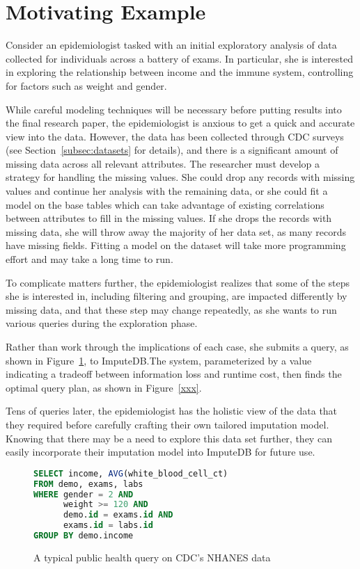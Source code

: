 \section{Motivating Example}
Consider an epidemiologist tasked with an initial
exploratory analysis of data collected for individuals across
a battery of exams. In particular, she is interested in exploring
the relationship between income and the immune system,
controlling for factors such as weight and gender.

While careful modeling techniques will be necessary before putting
results into the final research paper, the epidemiologist is anxious
to get a quick and accurate view into the data. However,
the data has been collected through CDC surveys (see Section~\ref{subsec:datasets} for details),
and there is a significant amount of missing data across all
relevant attributes. The researcher must develop a strategy
for handling the missing values. She could drop any records with
missing values and continue her analysis with the remaining data,
or she could fit a model on the base tables which can take advantage of existing correlations between attributes to fill in the missing values.
If she drops the records with missing data, she will throw away the majority of her data set, as many records have missing fields.
Fitting a model on the dataset will take more programming effort and may take a long time to run.

To complicate matters further, the epidemiologist realizes that
some of the steps she is interested in, including filtering and grouping,
are impacted differently by missing data, and that these step may change
repeatedly, as she wants to run various queries during the exploration phase.

Rather than work through
the implications of each case, she submits a query, as shown in Figure~\ref{fig:example-query}, to ImputeDB.\@ The system, parameterized by a value indicating
a tradeoff between information loss and runtime cost, then finds
the optimal query plan, as shown in Figure~\ref{xxx}.

Tens of queries later, the epidemiologist has the holistic view of the
data that they required before carefully crafting their own tailored
imputation model. Knowing that there may be a need to explore
this data set further, they can easily incorporate their imputation model
into ImputeDB for future use.

\begin{figure}
\begin{lstlisting}[language=SQL]
SELECT income, AVG(white_blood_cell_ct)
FROM demo, exams, labs
WHERE gender = 2 AND 
      weight >= 120 AND
      demo.id = exams.id AND 
      exams.id = labs.id
GROUP BY demo.income
\end{lstlisting}
\caption{A typical public health query on CDC's NHANES data}
\label{fig:example-query}
\end{figure}

